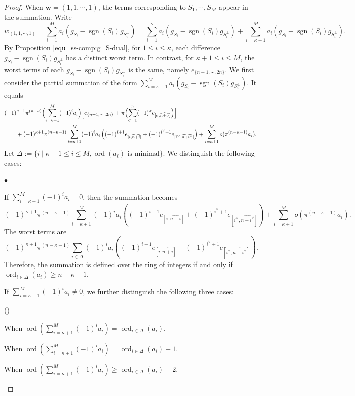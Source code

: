 \documentclass[pdflatex,sn-mathphys-num]{sn-jnl}%
\theoremstyle{thmstyleone}%
\theoremstyle{thmstyletwo}%
\numberwithin{equation}{subsection}
\theoremstyle{thmstylethree}%
\DeclareMathOperator{\ord}{ord}
\DeclareMathOperator{\sgn}{sgn}
\newcommand{\wh}{\widehat}
\newenvironment{altenumerate2}
	{\begin{list}
			{\textup{(\theenumii)} }
			{\usecounter{enumii}
				\setlength{\labelwidth}{0pt}
				\setlength{\labelsep}{0pt}
				\setlength{\leftmargin}{2em}
				\setlength{\itemsep}{\the\smallskipamount}
				\renewcommand{\theenumii}{\alph{enumii}}
		}}
		{\end{list}}
\newenvironment{altitemize}
	{\begin{list}
			{$\bullet$}
			{\setlength{\labelwidth}{0pt}
				\setlength{\itemindent}{5pt}
				\setlength{\labelsep}{5pt}
				\setlength{\leftmargin}{0pt}
				\setlength{\itemsep}{\the\smallskipamount}
		}}
		{\end{list}}
\begin{document}
\begin{proof}
When $\mathbf{w} = (1,1,\cdots,1)$, the terms corresponding to $S_1,\cdots, S_M$ appear in the summation. Write
\begin{equation*}
	w_{(1,1,\cdots,1)}=\sum_{i=1}^M a_i(g_{S_i}-\sgn(S_i)g_{S_i^\perp})=\sum_{i=1}^\kappa a_i(g_{S_i}-\sgn(S_i)g_{S_i^\perp})+\sum_{i=\kappa+1}^M a_i(g_{S_i}-\sgn(S_i)g_{S_i^\perp}).
\end{equation*}
By Proposition \ref{equ_ss-comp:g_S-dual}, for $1\leq i\leq \kappa$, each difference $g_{S_i}-\sgn(S_i)g_{S_i^\perp}$ has a distinct worst term.
In contrast, for $\kappa+1\leq i\leq M$, the worst terms of each $g_{S_i}-\sgn(S_i)g_{S_i^\perp}$ is the same, namely $e_{\{n+1,\cdots,2n\}}$.
We first consider the partial summation of the form $\sum_{i=\kappa+1}^M a_i(g_{S_i}-\sgn(S_i)g_{S_i^\perp})$. It equals
\begin{align*}
    &(-1)^{\kappa+1}\pi^{(n-\kappa)}\Bigl(\sum_{i=\kappa+1}^M(-1)^ia_i\Bigr)\Bigl[
    e_{\{n+1,\cdots,2n\}}+\pi \Bigl(\sum_{\sigma=1}^n(-1)^\sigma e_{[\sigma,\wh{n+\sigma}]}\Bigr)\Bigr]\\
    &\qquad +(-1)^{\kappa+1}\pi^{(n-\kappa-1)}\sum_{i=\kappa+1}^M (-1)^i a_i\left((-1)^{i+1}e_{[i,\wh{n+i}]}+(-1)^{i^\vee+1}e_{[i^\vee,\wh{n+i^\vee}]}\right)
    +\sum_{i=\kappa+1}^M o(\pi^{(n-\kappa-1)} a_i).
\end{align*}
Let $\Delta:=\{i\mid \kappa+1\leq i\leq M, \ord(a_i)\text{ is minimal}\}$. We distinguish the following cases:
\begin{altitemize}
\item 
If $\sum_{i=\kappa+1}^M (-1)^ia_i=0$, then the summation becomes
\begin{equation*}
    (-1)^{\kappa+1}\pi^{(n-\kappa-1)}\sum_{i=\kappa+1}^M (-1)^i a_i\left((-1)^{i+1}e_{[i,\wh{n+i}]}+(-1)^{i^\vee+1}e_{[i^\vee,\wh{n+i^\vee}]}\right)
    +\sum_{i=\kappa+1}^M o(\pi^{(n-\kappa-1)} a_i).
\end{equation*}
The worst terms are 
\begin{equation*}
    (-1)^{\kappa+1}\pi^{(n-\kappa-1)}\sum_{i\in\Delta} (-1)^i a_i\left((-1)^{i+1}e_{[i,\wh{n+i}]}+(-1)^{i^\vee+1}e_{[i^\vee,\wh{n+i^\vee}]}\right).
\end{equation*}
Therefore, the summation is defined over the ring of integers if and only if $\ord_{i\in\Delta}(a_i)\geq n-\kappa-1$.
\item 
If $\sum_{i=\kappa+1}^M(-1)^ia_i\neq 0$, we further distinguish the following three cases: 
\begin{altenumerate2}
\item When $\ord\left(\sum_{i=\kappa+1}^M (-1)^i a_i\right)=\ord_{i\in\Delta}(a_i)$.
\item When $\ord\left(\sum_{i=\kappa+1}^M (-1)^i a_i\right)=\ord_{i\in\Delta}(a_i)+1$.
\item When $\ord\left(\sum_{i=\kappa+1}^M (-1)^i a_i\right)\geq\ord_{i\in\Delta}(a_i)+2$.
\end{altenumerate2}


\end{altitemize}
\end{proof}
\end{document}
